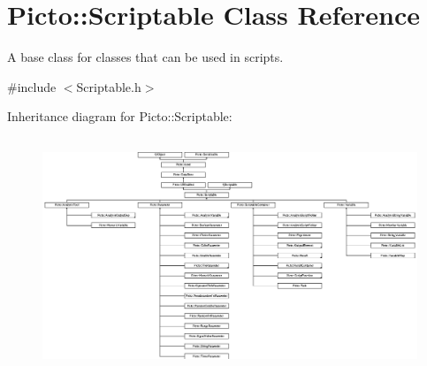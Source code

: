 \hypertarget{class_picto_1_1_scriptable}{\section{Picto\-:\-:Scriptable Class Reference}
\label{class_picto_1_1_scriptable}
}


A base class for classes that can be used in scripts.  




{\ttfamily \#include $<$Scriptable.\-h$>$}

Inheritance diagram for Picto\-:\-:Scriptable\-:\begin{figure}[H]
\begin{center}
\leavevmode
\includegraphics[height=7.033493cm]{class_picto_1_1_scriptable}
\end{center}
\end{figure}
